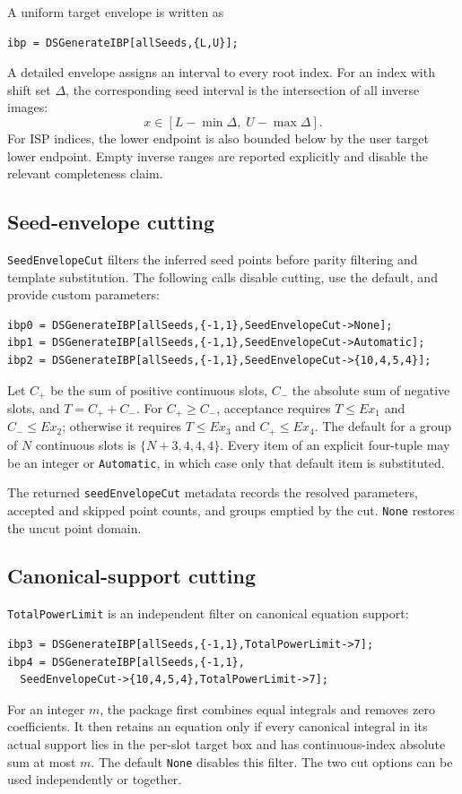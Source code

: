 ﻿\documentclass[a4paper,11pt]{article}
\begin{document}
A uniform target envelope is written as
\begin{verbatim}
ibp = DSGenerateIBP[allSeeds,{L,U}];
\end{verbatim}
A detailed envelope assigns an interval to every root index. For an index with shift set
$\Delta$, the corresponding seed interval is the intersection of all inverse images:
\begin{equation}
 x\in[L-\min\Delta,\;U-\max\Delta].
 \label{handbookSeedInverse}
\end{equation}
For ISP indices, the lower endpoint is also bounded below by the user target lower endpoint.
Empty inverse ranges are reported explicitly and disable the relevant completeness claim.

\subsection{Seed-envelope cutting}

\texttt{SeedEnvelopeCut} filters the inferred seed points before parity filtering and
template substitution. The following calls disable cutting, use the default, and provide
custom parameters:
\begin{verbatim}
ibp0 = DSGenerateIBP[allSeeds,{-1,1},SeedEnvelopeCut->None];
ibp1 = DSGenerateIBP[allSeeds,{-1,1},SeedEnvelopeCut->Automatic];
ibp2 = DSGenerateIBP[allSeeds,{-1,1},SeedEnvelopeCut->{10,4,5,4}];
\end{verbatim}
Let $C_+$ be the sum of positive continuous slots, $C_-$ the absolute sum of negative
slots, and $T=C_++C_-$. For $C_+\geq C_-$, acceptance requires $T\leq Ex_1$ and
$C_-\leq Ex_2$; otherwise it requires $T\leq Ex_3$ and $C_+\leq Ex_4$. The default for a
group of $N$ continuous slots is $\{N+3,4,4,4\}$. Every item of an explicit four-tuple may
be an integer or \texttt{Automatic}, in which case only that default item is substituted.

The returned \texttt{seedEnvelopeCut} metadata records the resolved parameters, accepted
and skipped point counts, and groups emptied by the cut. \texttt{None} restores the uncut
point domain.

\subsection{Canonical-support cutting}

\texttt{TotalPowerLimit} is an independent filter on canonical equation support:
\begin{verbatim}
ibp3 = DSGenerateIBP[allSeeds,{-1,1},TotalPowerLimit->7];
ibp4 = DSGenerateIBP[allSeeds,{-1,1},
  SeedEnvelopeCut->{10,4,5,4},TotalPowerLimit->7];
\end{verbatim}
For an integer $m$, the package first combines equal integrals and removes zero coefficients.
It then retains an equation only if every canonical integral in its actual support lies in
the per-slot target box and has continuous-index absolute sum at most $m$. The default
\texttt{None} disables this filter. The two cut options can be used independently or together.
\end{document}
